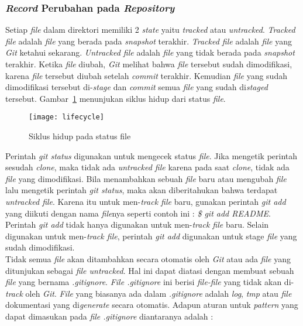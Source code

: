 \subsubsection{\textit{Record} Perubahan pada \textit{Repository}}
Setiap \textit{file} dalam direktori memiliki 2 \textit{state} yaitu \textit{tracked} atau \textit{untracked}. \textit{Tracked file} adalah \textit{file} yang berada pada \textit{snapshot} terakhir. \textit{Tracked file} adalah \textit{file} yang \textit{Git} ketahui sekarang. \textit{Untracked file} adalah \textit{file} yang tidak berada pada \textit{snapshot} terakhir. Ketika \textit{file} diubah, \textit{Git} melihat bahwa \textit{file} tersebut sudah dimodifikasi, karena \textit{file} tersebut diubah setelah \textit{commit} terakhir. Kemudian \textit{file} yang sudah dimodifikasi tersebut di-\textit{stage} dan \textit{commit} semua \textit{file} yang sudah di\textit{staged} tersebut. Gambar~\ref{fig:lifecycle} menunjukan siklus hidup dari status \textit{file}.

\begin{figure}[H]
	\centering  
	\texttt{[image: lifecycle]}  
	\caption[Siklus hidup pada status \textit{file}]{Siklus hidup pada status file}
	\label{fig:lifecycle} 
\end{figure}

Perintah \textit{git status} digunakan untuk mengecek status \textit{file}. Jika mengetik perintah sesudah \textit{clone}, maka tidak ada \textit{untracked file} karena pada saat \textit{clone}, tidak ada \textit{file} yang dimodifikasi. Bila menambahkan sebuah \textit{file} baru atau mengubah \textit{file} lalu mengetik perintah \textit{git status}, maka akan diberitahukan bahwa terdapat \textit{untracked file}. Karena itu untuk men-\textit{track file} baru, gunakan perintah \textit{git add} yang diikuti dengan nama \textit{file}nya seperti contoh ini : \textit{\$ git add README}. Perintah \textit{git add} tidak hanya digunakan untuk men-\textit{track file} baru. Selain digunakan untuk men-\textit{track file}, perintah \textit{git add} digunakan untuk stage \textit{file} yang sudah dimodifikasi.\\

Tidak semua \textit{file} akan ditambahkan secara otomatis oleh \textit{Git} atau ada \textit{file} yang ditunjukan sebagai \textit{file untracked}. Hal ini dapat diatasi dengan membuat sebuah \textit{file} yang bernama \textit{.gitignore}. \textit{File .gitignore} ini berisi \textit{file-file} yang tidak akan di-\textit{track} oleh \textit{Git}. \textit{File} yang biasanya ada dalam \textit{.gitignore} adalah \textit{log}, \textit{tmp} atau \textit{file} dokumentasi yang di\textit{generate} secara otomatis. Adapun aturan untuk \textit{pattern} yang dapat dimasukan pada \textit{file .gitignore} diantaranya adalah :

